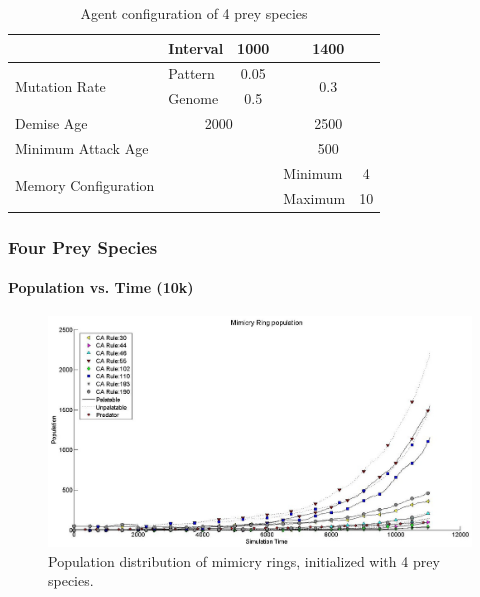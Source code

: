 {\begin{table}
\begin{tiny}
\begin{spacing}{1.5}
\begin{tabular}{|l|l|c|c|l|c|}
	  						 									& Interval  & \multicolumn{2}{|c|}{1000} & \multicolumn{2}{|c|}{1400} \\ \hline
	  \multirow{2}{*}{Mutation Rate} & Pattern   & \multicolumn{2}{|c|}{0.05} & \multicolumn{2}{|c|}{\multirow{2}{*}{0.3}} \\ \cline{2-4}
	  						 									 & Genome    & \multicolumn{2}{|c|}{0.5}  & \multicolumn{2}{|c|}{} \\ \hline
	  Demise Age	 									 & \multicolumn{3}{|c|}{2000}							& \multicolumn{2}{|c|}{2500} \\ \hline
	  Minimum Attack Age						 & \multicolumn{3}{|c|}{} 						    & \multicolumn{2}{|c|}{500} \\ \hline
	  \multirow{2}{*}{Memory Configuration} & \multicolumn{3}{|c|}{} 					& Minimum & 4 \\ \cline{5-6}
	   																			& \multicolumn{3}{|c|}{} 					& Maximum & 10 \\ \hline  
	\end{tabular}
	\end{spacing}
	\end{tiny}
	\caption{Agent configuration of 4 prey species}
	\label{tab:config-table-4-prey}
	\end{table}
}

\frame
{
	\frametitle{Four Prey Species}
	\framesubtitle{Population vs. Time (10k)}

	\begin{figure}
		\centering
		\includegraphics[scale=0.25]{../tex/images/simTime10k-4Prey}
		\caption{Population distribution of mimicry rings, initialized with 4 prey species.}
		\label{fig:plot-4-prey}
	\end{figure}
}

